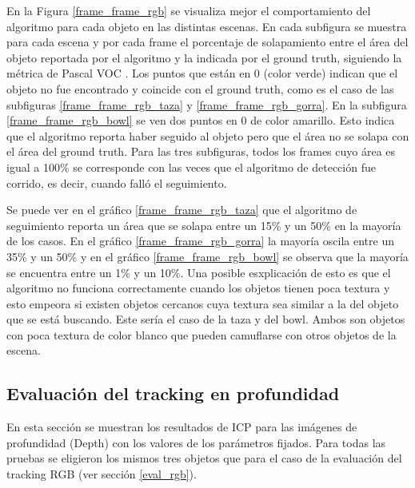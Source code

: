 En la Figura \ref{frame_frame_rgb} se visualiza mejor el comportamiento del algoritmo para cada objeto en las distintas escenas. En cada subfigura se muestra para cada escena y por cada frame el porcentaje de solapamiento entre el área del objeto reportada por el algoritmo y la indicada por el ground truth, siguiendo la métrica de Pascal VOC \cite{everinghampascal}.  Los puntos que están en 0 (color verde) indican que el objeto no fue encontrado y coincide con el ground truth, como es el caso de las subfiguras \ref{frame_frame_rgb_taza} y \ref{frame_frame_rgb_gorra}. En la subfigura \ref{frame_frame_rgb_bowl} se ven dos puntos en 0 de color amarillo. Esto indica que el algoritmo reporta haber seguido al objeto pero que el área no se solapa con el área del ground truth. Para las tres subfiguras, todos los frames cuyo área es igual a 100\% se corresponde con las veces que el algoritmo de detección fue corrido, es decir, cuando falló el seguimiento.

Se puede ver en el gráfico \ref{frame_frame_rgb_taza} que el algoritmo de seguimiento reporta un área que se solapa entre un 15\% y un 50\% en la mayoría de los casos. En el gráfico \ref{frame_frame_rgb_gorra} la mayoría oscila entre un 35\% y un 50\% y en el gráfico \ref{frame_frame_rgb_bowl} se observa que la mayoría se encuentra entre un 1\% y un 10\%. Una posible esxplicación de esto es que el algoritmo no funciona correctamente cuando los objetos tienen poca textura y esto empeora si existen objetos cercanos cuya textura sea similar a la del objeto que se está buscando. Este sería el caso de la taza y del bowl. Ambos son objetos con poca textura de color blanco que pueden camuflarse con otros objetos de la escena.

\subsection{Evaluación del tracking en profundidad}
En esta sección se muestran los resultados de ICP para las imágenes de profundidad (Depth) con los valores de los parámetros fijados. Para todas las pruebas se eligieron los mismos tres objetos que para el caso de la evaluación del tracking RGB (ver sección \ref{eval_rgb}).

